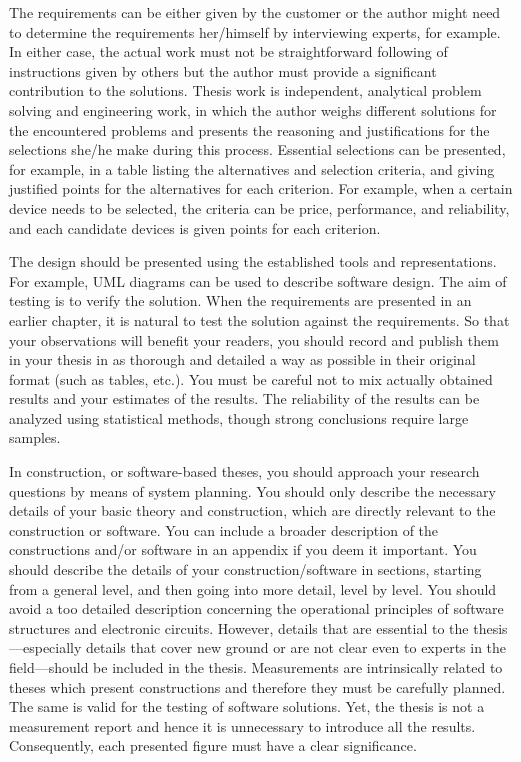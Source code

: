 The requirements can be either given by the customer or the author might need to determine the requirements her/himself by interviewing experts, for example. In either case, the actual work must not be straightforward following of instructions given by others but the author must provide a significant contribution to the solutions. Thesis work is independent, analytical problem solving and engineering work, in which the author weighs different solutions for the encountered problems and presents the reasoning and justifications for the selections she/he make during this process. Essential selections can be presented, for example, in a table listing the alternatives and selection criteria, and giving justified points for the alternatives for each criterion. For example, when a certain device needs to be selected, the criteria can be price, performance, and reliability, and each candidate devices is given points for each criterion.

The design should be presented using the established tools and representations. For example, UML diagrams can be used to describe software design. The aim of testing is to verify the solution. When the requirements are presented in an earlier chapter, it is natural to test the solution against the requirements. So that your observations will benefit your readers, you should record and publish them in your thesis in as thorough and detailed a way as possible in their original format (such as tables, etc.). You must be careful not to mix actually obtained results and your estimates of the results. The reliability of the results can be analyzed using statistical methods, though strong conclusions require large samples.

In construction, or software-based theses, you should approach your research questions by means of system planning. You should only describe the necessary details of your basic theory and construction, which are directly relevant to the construction or software. You can include a broader description of the constructions and/or software in an appendix if you deem it important. You should describe the details of your construction/software in sections, starting from a general level, and then going into more detail, level by level. You should avoid a too detailed description concerning the operational principles of software structures and electronic circuits. However, details that are essential to the thesis---especially details that cover new ground or are not clear even to experts in the field---should be included in the thesis.
Measurements are intrinsically related to theses which present constructions and therefore they must be carefully planned. The same is valid for the testing of software solutions. Yet, the thesis is not a measurement report and hence it is unnecessary to introduce all the results. Consequently, each presented figure must have a clear significance.


